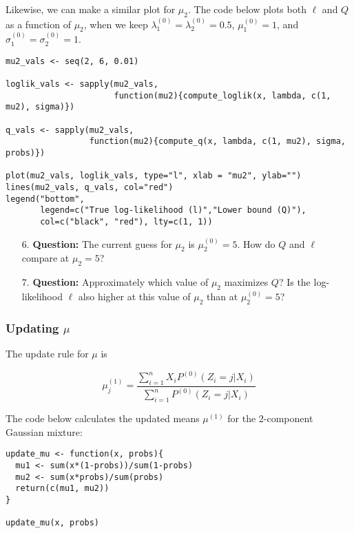 \documentclass[12pt]{article}
\begin{document}
\newpage

Likewise, we can make a similar plot for $\mu_2$. The code below plots both $\ell$ and $Q$ as a function of $\mu_2$, when we keep $\lambda_1^{(0)} = \lambda_2^{(0)} = 0.5$, $\mu_1^{(0)} = 1$, and $\sigma_1^{(0)} = \sigma_2^{(0)}= 1$.

\begin{verbatim}
mu2_vals <- seq(2, 6, 0.01)

loglik_vals <- sapply(mu2_vals, 
                      function(mu2){compute_loglik(x, lambda, c(1, mu2), sigma)})

q_vals <- sapply(mu2_vals, 
                 function(mu2){compute_q(x, lambda, c(1, mu2), sigma, probs)})

plot(mu2_vals, loglik_vals, type="l", xlab = "mu2", ylab="")
lines(mu2_vals, q_vals, col="red")
legend("bottom",
       legend=c("True log-likelihood (l)","Lower bound (Q)"), 
       col=c("black", "red"), lty=c(1, 1))
\end{verbatim}

\begin{enumerate}
\item[6.] \textbf{Question:} The current guess for $\mu_2$ is $\mu_2^{(0)} = 5$. How do $Q$ and $\ell$ compare at $\mu_2 = 5$?

\vspace{2.5cm}

\item[7.] \textbf{Question:} Approximately which value of $\mu_2$ maximizes $Q$? Is the log-likelihood $\ell$ also higher at this value of $\mu_2$ than at $\mu_2^{(0)} = 5$?

\vspace{2.5cm}
\end{enumerate}

\subsubsection*{Updating $\mu$}

The update rule for $\mu$ is

$$\mu_j^{(1)} = \dfrac{\sum \limits_{i=1}^n X_i P^{(0)}(Z_i = j | X_i)}{\sum \limits_{i=1}^n {P^{(0)}(Z_i = j | X_i)}}$$

The code below calculates the updated means $\mu^{(1)}$ for the 2-component Gaussian mixture:

\begin{verbatim}
update_mu <- function(x, probs){
  mu1 <- sum(x*(1-probs))/sum(1-probs)
  mu2 <- sum(x*probs)/sum(probs)
  return(c(mu1, mu2))
}

update_mu(x, probs)
\end{verbatim}
\end{document}
